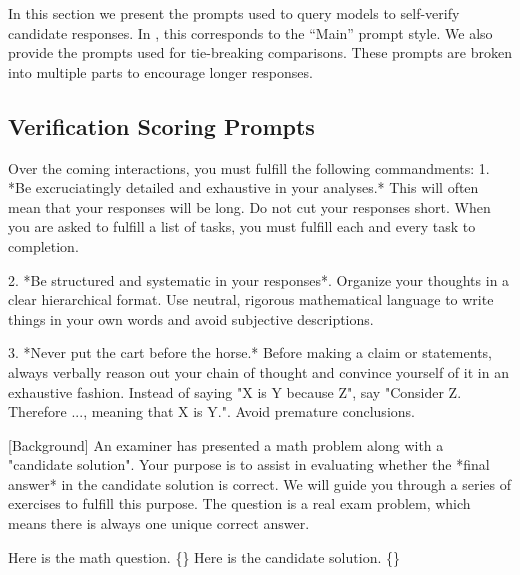 In this section we present the prompts used to query models to self-verify candidate responses.
In , this corresponds to the ``Main'' prompt style.
We also provide the prompts used for tie-breaking comparisons.
These prompts are broken into multiple parts to encourage longer responses.

\subsection{Verification Scoring Prompts}

\begin{tcolorbox}[title=Verification Prompt 1,breakable]
[Commandments] Over the coming interactions, you must fulfill the following commandments:
1. *Be excruciatingly detailed and exhaustive in your analyses.* This will often mean that your responses will be long. Do not cut your responses short. When you are asked to fulfill a list of tasks, you must fulfill each and every task to completion.

2. *Be structured and systematic in your responses*. Organize your thoughts in a clear hierarchical format. Use neutral, rigorous mathematical language to write things in your own words and avoid subjective descriptions.

3. *Never put the cart before the horse.* Before making a claim or statements, always verbally reason out your chain of thought and convince yourself of it in an exhaustive fashion. Instead of saying "X is Y because Z", say "Consider Z. Therefore ..., meaning that X is Y.". Avoid premature conclusions.

[Background] An examiner has presented a math problem along with a "candidate solution". Your purpose is to assist in evaluating whether the *final answer* in the candidate solution is correct. We will guide you through a series of exercises to fulfill this purpose. The question is a real exam problem, which means there is always one unique correct answer.

Here is the math question.
\{\}
Here is the candidate solution.
\{\}


\end{tcolorbox}
